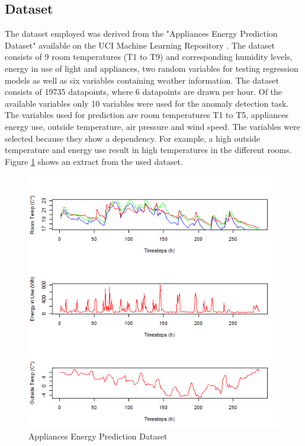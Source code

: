 \subsection{Dataset}
The dataset employed was derived from the "Appliances Energy Prediction Dataset" available on the UCI Machine Learning Repository \parencite{Candanedo2015}. The dataset consists of 9 room temperatures (T1 to T9) and corresponding humidity levels, energy in use of light and appliances, two random variables for testing regression models as well as six variables containing weather information. The dataset consists of 19735 datapoints, where 6 datapoints are drawn per hour. Of the available variables only 10 variables were used for the anomaly detection task. The variables used for prediction are room temperatures T1 to T5, appliances energy use, outside temperature, air pressure and wind speed. The variables were selected because they show a dependency. For example, a high outside temperature and energy use result in high temperatures in the different rooms. Figure \ref{fig:temp_dataset} shows an extract from the used dataset.


\begin{figure}[h]
	\centering
	\includegraphics[scale=0.6]{Figures/temp_dataset}
	\decoRule
	\caption[Temperature Dataset]{Appliances Energy Prediction Dataset \parencite{Own}}
	\label{fig:temp_dataset}
\end{figure}

